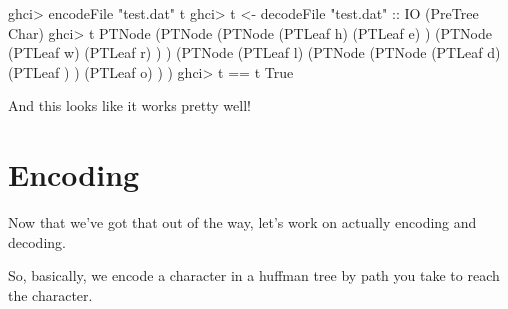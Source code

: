 \documentclass[]{article}
\newenvironment{Shaded}{}{}
\newcommand{\CharTok}[1]{\textcolor[rgb]{0.25,0.44,0.63}{#1}}
\newcommand{\DataTypeTok}[1]{\textcolor[rgb]{0.56,0.13,0.00}{#1}}
\newcommand{\NormalTok}[1]{#1}
\newcommand{\OperatorTok}[1]{\textcolor[rgb]{0.40,0.40,0.40}{#1}}
\newcommand{\OtherTok}[1]{\textcolor[rgb]{0.00,0.44,0.13}{#1}}
\newcommand{\StringTok}[1]{\textcolor[rgb]{0.25,0.44,0.63}{#1}}
\begin{document}
\begin{Shaded}
\begin{Highlighting}[]
\NormalTok{ghci}\OperatorTok{\textgreater{}}\NormalTok{ encodeFile }\StringTok{"test.dat"}\NormalTok{ t}
\NormalTok{ghci}\OperatorTok{\textgreater{}}\NormalTok{ t\textquotesingle{} }\OtherTok{\textless{}{-}}\NormalTok{ decodeFile }\StringTok{"test.dat"}\OtherTok{ ::} \DataTypeTok{IO}\NormalTok{ (}\DataTypeTok{PreTree} \DataTypeTok{Char}\NormalTok{)}
\NormalTok{ghci}\OperatorTok{\textgreater{}}\NormalTok{ t\textquotesingle{}}
\DataTypeTok{PTNode}\NormalTok{ (}\DataTypeTok{PTNode}\NormalTok{ (}\DataTypeTok{PTNode}\NormalTok{ (}\DataTypeTok{PTLeaf} \CharTok{\textquotesingle{}h\textquotesingle{}}\NormalTok{)}
\NormalTok{                       (}\DataTypeTok{PTLeaf} \CharTok{\textquotesingle{}e\textquotesingle{}}\NormalTok{)}
\NormalTok{               )}
\NormalTok{               (}\DataTypeTok{PTNode}\NormalTok{ (}\DataTypeTok{PTLeaf} \CharTok{\textquotesingle{}w\textquotesingle{}}\NormalTok{)}
\NormalTok{                       (}\DataTypeTok{PTLeaf} \CharTok{\textquotesingle{}r\textquotesingle{}}\NormalTok{)}
\NormalTok{               )}
\NormalTok{       )}
\NormalTok{       (}\DataTypeTok{PTNode}\NormalTok{ (}\DataTypeTok{PTLeaf} \CharTok{\textquotesingle{}l\textquotesingle{}}\NormalTok{)}
\NormalTok{               (}\DataTypeTok{PTNode}\NormalTok{ (}\DataTypeTok{PTNode}\NormalTok{ (}\DataTypeTok{PTLeaf} \CharTok{\textquotesingle{}d\textquotesingle{}}\NormalTok{)}
\NormalTok{                               (}\DataTypeTok{PTLeaf} \CharTok{\textquotesingle{} \textquotesingle{}}\NormalTok{)}
\NormalTok{                       )}
\NormalTok{                       (}\DataTypeTok{PTLeaf} \CharTok{\textquotesingle{}o\textquotesingle{}}\NormalTok{)}
\NormalTok{               )}
\NormalTok{       )}
\NormalTok{ghci}\OperatorTok{\textgreater{}}\NormalTok{ t\textquotesingle{} }\OperatorTok{==}\NormalTok{ t}
\DataTypeTok{True}
\end{Highlighting}
\end{Shaded}

And this looks like it works pretty well!

\section{Encoding}\label{encoding}

Now that we've got that out of the way, let's work on actually encoding and
decoding.

So, basically, we encode a character in a huffman tree by path you take to reach
the character.
\end{document}
